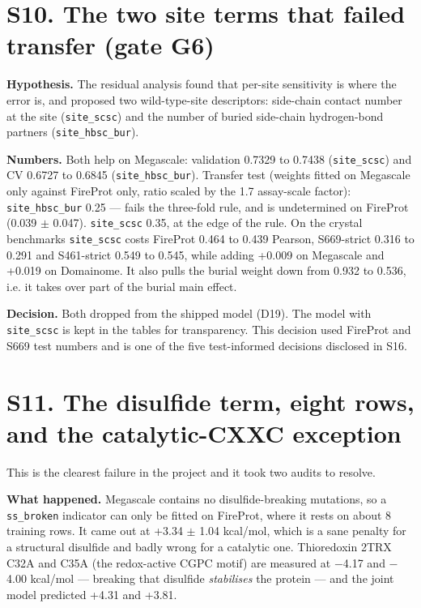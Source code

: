 \documentclass[11pt,a4paper]{article}
\begin{document}
\section{S10. The two site terms that failed transfer (gate G6)}

\textbf{Hypothesis.} The residual analysis found that per-site sensitivity is where the error is, and proposed two
wild-type-site descriptors: side-chain contact number at the site (\texttt{site\_scsc}) and the number of buried
side-chain hydrogen-bond partners (\texttt{site\_hbsc\_bur}).

\textbf{Numbers.} Both help on Megascale: validation 0.7329 to 0.7438 (\texttt{site\_scsc}) and CV 0.6727 to 0.6845
(\texttt{site\_hbsc\_bur}). Transfer test (weights fitted on Megascale only against FireProt only, ratio scaled by the
1.7 assay-scale factor): \texttt{site\_hbsc\_bur} 0.25 --- fails the three-fold rule, and is undetermined on FireProt
(0.039 $\pm$ 0.047). \texttt{site\_scsc} 0.35, at the edge of the rule. On the crystal benchmarks \texttt{site\_scsc} costs FireProt
0.464 to 0.439 Pearson, S669-strict 0.316 to 0.291 and S461-strict 0.549 to 0.545, while adding +0.009 on
Megascale and +0.019 on Domainome. It also pulls the burial weight down from 0.932 to 0.536, i.e. it takes over
part of the burial main effect.

\textbf{Decision.} Both dropped from the shipped model (D19). The model with \texttt{site\_scsc} is kept in the tables for
transparency. This decision used FireProt and S669 test numbers and is one of the five test-informed decisions
disclosed in S16.



\section{S11. The disulfide term, eight rows, and the catalytic-CXXC exception}

This is the clearest failure in the project and it took two audits to resolve.

\textbf{What happened.} Megascale contains no disulfide-breaking mutations, so a \texttt{ss\_broken} indicator can only be
fitted on FireProt, where it rests on about 8 training rows. It came out at +3.34 $\pm$ 1.04 kcal/mol, which is a
sane penalty for a structural disulfide and badly wrong for a catalytic one. Thioredoxin 2TRX C32A and C35A
(the redox-active CGPC motif) are measured at $-$4.17 and $-$4.00 kcal/mol --- breaking that disulfide \emph{stabilises}
the protein --- and the joint model predicted +4.31 and +3.81.
\end{document}
